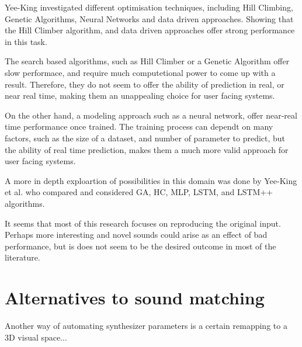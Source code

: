 Yee-King investigated different optimisation techniques, including
Hill Climbing, Genetic Algorithms, Neural Networks and data driven
approaches\cite{yee-king_automatic_nodate}. Showing that the Hill
Climber algorithm, and data driven approaches offer strong performance
in this task\cite{yee-king_comparison_2011}.

The search based algorithms, such as Hill Climber or a Genetic
Algorithm offer slow performace, and require much computetional power
to come up with a result. Therefore, they do not seem to offer the
ability of prediction in real, or near real time, making them an
unappealing choice for user facing systems.

On the other hand, a modeling approach such as a neural network, offer
near-real time performance once trained. The training process can
dependt on many factors, such as the size of a dataset, and number of
parameter to predict\cite{yee-king_automatic_nodate}, but the ability
of real time prediction, makes them a much more valid approach for
user facing systems.

A more in depth exploartion of possibilities in this domain was done
by Yee-King et al. who compared and considered GA, HC, MLP, LSTM, and
LSTM++ algorithms\cite{yee-king_automatic_2018}.

It seems that most of this research focuses on reproducing the
original input\cite{tatar_automatic_2016}. Perhaps more interesting
and novel sounds could arise as an effect of bad performance, but is
does not seem to be the desired outcome in most of the literature.

\section{Alternatives to sound matching}

Another way of automating synthesizer parameters is a certain
remapping to a 3D visual space...






